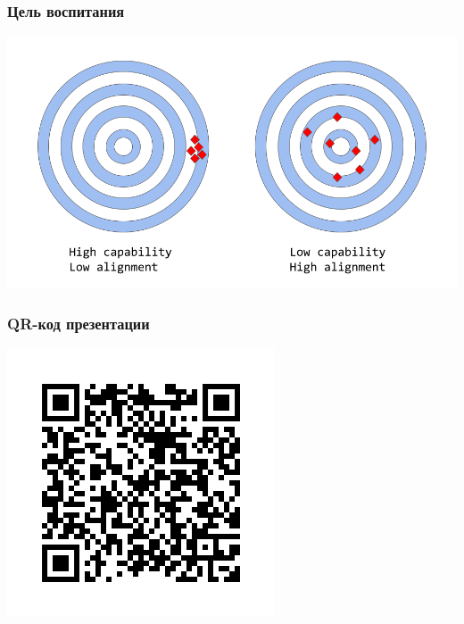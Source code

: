 \documentclass[10pt]{beamer}
\begin{document}
\begin{frame}
  \frametitle{Цель воспитания}
  \begin{center}
    \includegraphics[width=1\linewidth]{pics/capability-versus-alignment.png}
  \end{center}
\end{frame}

\begin{frame}
  \frametitle{QR-код презентации}
  \centering
  \includegraphics[width=0.5\linewidth]{pics/qr-code.png}
\end{frame}
\end{document}
